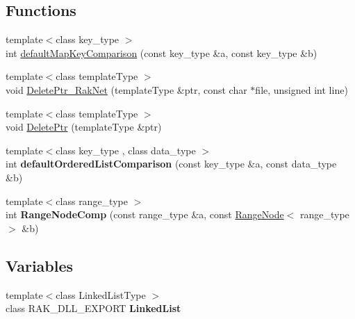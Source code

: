 \subsection*{Functions}
\begin{DoxyCompactItemize}
\item 
{\footnotesize template$<$class key\-\_\-type $>$ }\\int \hyperlink{namespace_data_structures_a141573e51ef42434451188a050e9a577}{default\-Map\-Key\-Comparison} (const key\-\_\-type \&a, const key\-\_\-type \&b)
\item 
{\footnotesize template$<$class template\-Type $>$ }\\void \hyperlink{namespace_data_structures_a4122fd2c409644863e7cb884c2f95bc4}{Delete\-Ptr\-\_\-\-Rak\-Net} (template\-Type \&ptr, const char $\ast$file, unsigned int line)
\item 
{\footnotesize template$<$class template\-Type $>$ }\\void \hyperlink{namespace_data_structures_ac554257c583d96878931af2bd10bbe2f}{Delete\-Ptr} (template\-Type \&ptr)
\item 
\hypertarget{namespace_data_structures_a7121bfdce3827886832c6966eb3fbf64}{{\footnotesize template$<$class key\-\_\-type , class data\-\_\-type $>$ }\\int {\bfseries default\-Ordered\-List\-Comparison} (const key\-\_\-type \&a, const data\-\_\-type \&b)}\label{namespace_data_structures_a7121bfdce3827886832c6966eb3fbf64}

\item 
\hypertarget{namespace_data_structures_afc5f5975263bc574b36bd99c3720dc83}{{\footnotesize template$<$class range\-\_\-type $>$ }\\int {\bfseries Range\-Node\-Comp} (const range\-\_\-type \&a, const \hyperlink{struct_data_structures_1_1_range_node}{Range\-Node}$<$ range\-\_\-type $>$ \&b)}\label{namespace_data_structures_afc5f5975263bc574b36bd99c3720dc83}

\end{DoxyCompactItemize}
\subsection*{Variables}
\begin{DoxyCompactItemize}
\item 
\hypertarget{namespace_data_structures_a2f6832c889cf38a2f1132838dfd1044f}{{\footnotesize template$<$class Linked\-List\-Type $>$ }\\class R\-A\-K\-\_\-\-D\-L\-L\-\_\-\-E\-X\-P\-O\-R\-T {\bfseries Linked\-List}}\label{namespace_data_structures_a2f6832c889cf38a2f1132838dfd1044f}

\end{DoxyCompactItemize}


